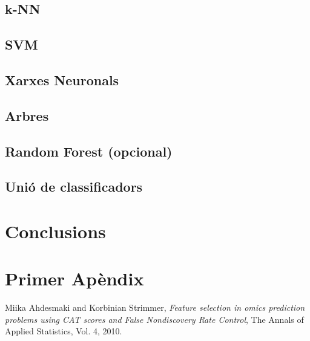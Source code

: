 \documentclass[a4paper,10pt]{article}
\begin{document}
\subsection{k-NN}
\subsection{SVM}
\subsection{Xarxes Neuronals}
\subsection{Arbres}
\subsection{Random Forest (opcional)}
\subsection{Unió de classificadors}
\section{Conclusions}


\appendix
\section{Primer Apèndix}

\begin{thebibliography}{9}


  Miika Ahdesmaki and Korbinian Strimmer,
  \emph{Feature selection in omics prediction problems using CAT scores and False Nondiscovery Rate Control},
  The Annals of Applied Statistics, 
  Vol. 4,
  2010.


\end{thebibliography}
\end{document}
